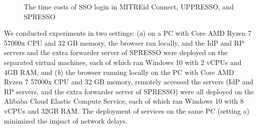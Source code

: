 \begin{figure}[tb]
  \hfill
  \vspace*{-5pt}
  \caption{The time costs of SSO login in MITREid Connect, UPPRESSO, and SPRESSO}
  \vspace*{-5pt}
  \label{fig:evaluation}
\end{figure}

We conducted experiments in two settings: (\emph{a}) on a PC with Core AMD Ryzen 7 57000x CPU and 32 GB memory, the browser ran locally, and the IdP and RP servers and the extra forwarder server of SPRESSO were deployed on the separated virtual machines, each of which ran Windows 10 with 2 vCPUs and 4GB RAM, and (\emph{b}) the browser running locally on the PC with Core AMD Ryzen 7 57000x CPU and 32 GB memory, remotely accessed the servers (IdP and RP servers, and the extra forwarder server of SPRESSO) were all deployed on the Alibaba Cloud Elastic Compute Service, each of which ran Windows 10 with 8 vCPUs and 32GB RAM. 
The deployment of services on the same PC (setting a) minimized the impact of network delays.

